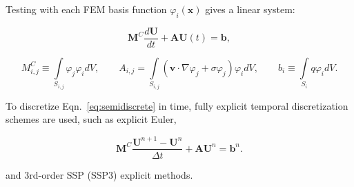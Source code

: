 Testing with each FEM basis function $\varphi_i(\mathbf{x})$ gives a linear system:

\begin{equation}\label{eq:semidiscrete}
      \mathbf{M}^C\frac{d\mathbf{U}}{dt}+\mathbf{A} \mathbf{U}(t) = \mathbf{b},
\end{equation}

\begin{equation}
	M^C_{i,j} \equiv \int\limits_{S_{i,j}}
    \varphi_j\varphi_i dV, \qquad
  A_{i,j} = \int\limits_{S_{i,j}}\left(
   \mathbf{v}\cdot\nabla\varphi_j +
   \sigma\varphi_j\right)\varphi_i dV, \qquad
	b_i \equiv \int\limits_{S_i} q\varphi_i dV.
\end{equation}

To discretize Eqn.~\ref{eq:semidiscrete} in time, fully explicit
temporal discretization schemes are used, such as explicit Euler,

\begin{equation}\label{eq:exgalerkin}
   \mathbf{M}^C\frac{\mathbf{U}^{n+1}-\mathbf{U}^n}{\Delta t}
     + \mathbf{A}\mathbf{U}^n = \mathbf{b}^n.
\end{equation}

and 3rd-order SSP (SSP3) explicit methods.
